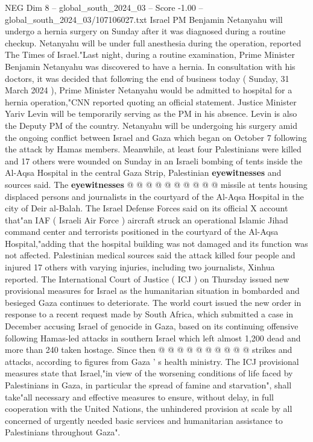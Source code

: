 \begin{textsample}{NEG Dim 8 – global\_south\_2024\_03 – Score -1.00 – global\_south\_2024\_03/107106027.txt}  \label{ex:f8_neg_361}
Israel PM Benjamin Netanyahu will undergo a hernia surgery on Sunday after it was diagnosed during a routine checkup.
Netanyahu will be under full anesthesia during the operation, reported The Times of Israel."Last night, during a routine examination, Prime Minister Benjamin Netanyahu was discovered to have a hernia.
In consultation with his doctors, it was decided that following the end of business today ( Sunday, 31 March 2024 ), Prime Minister Netanyahu would be admitted to hospital for a hernia operation,"CNN reported quoting an official statement.
Justice Minister Yariv Levin will be temporarily serving as the PM in his absence.
Levin is also the Deputy PM of the country.
Netanyahu will be undergoing his surgery amid the ongoing conflict between Israel and Gaza which began on October 7 following the attack by Hamas members.
Meanwhile, at least four Palestinians were killed and 17 others were wounded on Sunday in an Israeli bombing of tents inside the Al-Aqsa Hospital in the central Gaza Strip, Palestinian \textbf{eyewitnesses} and sources said.
The \textbf{eyewitnesses} @ @ @ @ @ @ @ @ @ @ missile at tents housing displaced persons and journalists in the courtyard of the Al-Aqsa Hospital in the city of Deir al-Balah.
The Israel Defense Forces said on its official X account that"an IAF ( Israeli Air Force ) aircraft struck an operational Islamic Jihad command center and terrorists positioned in the courtyard of the Al-Aqsa Hospital,"adding that the hospital building was not damaged and its function was not affected.
Palestinian medical sources said the attack killed four people and injured 17 others with varying injuries, including two journalists, Xinhua reported.
The International Court of Justice ( ICJ ) on Thursday issued new provisional measures for Israel as the humanitarian situation in bombarded and besieged Gaza continues to deteriorate.
The world court issued the new order in response to a recent request made by South Africa, which submitted a case in December accusing Israel of genocide in Gaza, based on its continuing offensive following Hamas-led attacks in southern Israel which left almost 1,200 dead and more than 240 taken hostage.
Since then @ @ @ @ @ @ @ @ @ @ strikes and attacks, according to figures from Gaza ' s health ministry.
The ICJ provisional measures state that Israel,"in view of the worsening conditions of life faced by Palestinians in Gaza, in particular the spread of famine and starvation", shall take"all necessary and effective measures to ensure, without delay, in full cooperation with the United Nations, the unhindered provision at scale by all concerned of urgently needed basic services and humanitarian assistance to Palestinians throughout Gaza".

\end{textsample}
